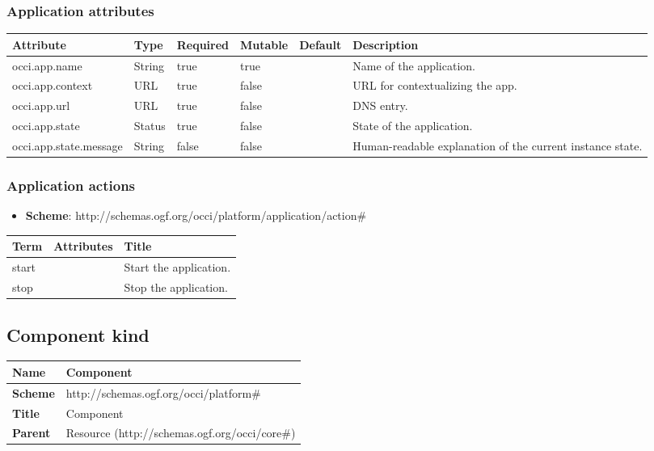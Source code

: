 \documentclass{article}
\begin{document}
\subsubsection{Application attributes}
\begin{tabularx}{\textwidth}{|l|l|p{1.4cm}|p{1.3cm}|l|X|}
  \hline
  \textbf{Attribute} & \textbf{Type} & \textbf{Required} & \textbf{Mutable} & \textbf{Default} & \textbf{Description} \\
  \hline  
  occi.app.name & String & true & true &  & Name of the application. \\
  \hline
  occi.app.context & URL & true & false &  & URL for contextualizing the app. \\
  \hline
  occi.app.url & URL & true & false &  & DNS entry. \\
  \hline
  occi.app.state & Status & true & false &  & State of the application. \\
  \hline
  occi.app.state.message & String & false & false &  & Human-readable explanation of the current instance state. \\
  \hline
\end{tabularx}

\subsubsection{Application actions}
\begin{itemize}
	\item \textbf{Scheme}: http://schemas.ogf.org/occi/platform/application/action\#
\end{itemize}
\begin{tabularx}{\textwidth}{|l|l|X|}
  \hline
  \textbf{Term}  & \textbf{Attributes} & \textbf{Title} \\
  \hline  
  start & & Start the application. \\
  \hline
  stop & & Stop the application. \\
  \hline
\end{tabularx}

\subsection{Component kind}
\begin{center}
\begin{tabular}{|l|l|}
  \hline
  \textbf{Name} & Component \\
  \hline  
  \textbf{Scheme} & http://schemas.ogf.org/occi/platform\# \\
  \hline
  \textbf{Title} & Component \\
  \hline
  \textbf{Parent} & Resource (http://schemas.ogf.org/occi/core\#) \\
  \hline
\end{tabular}
\end{center}
\end{document}

